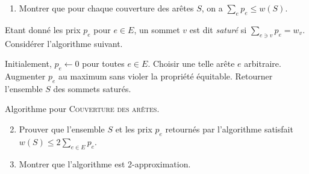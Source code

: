 \documentclass[12pt]{article}
\begin{document}
\begin{enumerate}
	\item Montrer que pour chaque couverture des arêtes $S$, on a $\sum_{e} p_{e} \leq w(S)$.
\end{enumerate}

 Etant donné les prix $p_{e}$ pour $e \in E$, 
		un sommet $v$ est dit \emph{saturé} si $\sum_{e\ni v} p_{e} = w_{v}$.
		Considérer l'algorithme suivant.
		
\begin{algorithm}[ht]
\begin{algorithmic}[1]  
\STATE Initialement, $p_{e} \gets 0$ pour toutes $e \in E$. 
	\STATE Choisir une telle arête $e$ arbitraire.
	\STATE Augmenter $p_{e}$ au maximum sans violer la propriété équitable.
\ENDWHILE
\STATE Retourner l'ensemble $S$ des sommets saturés.
\end{algorithmic}
\caption{Algorithme pour \textsc{Couverture des arêtes}.}
\label{algo:covering}
\end{algorithm}

\begin{enumerate}
	\setcounter{enumi}{1}
	\item Prouver que l'ensemble $S$ et les prix $p_{e}$ retournés par l'algorithme satisfait $w(S) \leq 2 \sum_{e \in E} p_{e}$.
	\item Montrer que l'algorithme est 2-approximation.
\end{enumerate}
\end{document}
